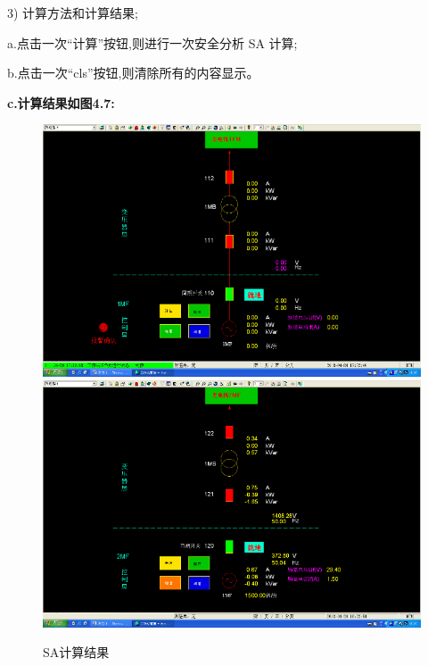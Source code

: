 \documentclass[a4paper]{ctexrep}
\begin{document}
                    3) 计算方法和计算结果;

                    \quad a.点击一次“计算”按钮,则进行一次安全分析 SA 计算;

                    \quad b.点击一次“cls”按钮,则清除所有的内容显示。

                    \quad \textbf{c.计算结果如图4.7:}

                    \begin{figure}[htbp]
                        \centering
                        \includegraphics[width=12cm]{7.png} 
                        \includegraphics[width=12cm]{8.png}
                        \caption{SA计算结果}
                    \end{figure}
\end{document}
